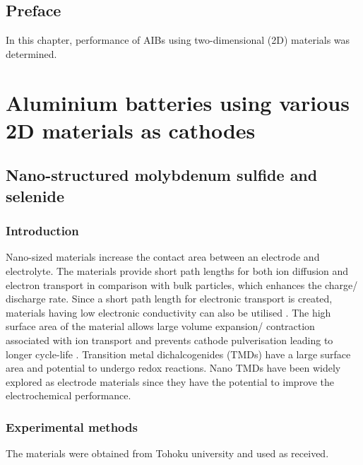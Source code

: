 \section*{Preface}
In this chapter, performance of AIBs using two-dimensional (2D) materials was determined.
\pagebreak
\chapter{Aluminium batteries using various 2D materials as cathodes} 
\label{chap6} 

\section{Nano-structured molybdenum sulfide and selenide}

\subsection{Introduction}
Nano-sized materials increase the contact area between an electrode and electrolyte. The materials provide short path lengths for both ion diffusion and electron transport in comparison with bulk particles, which enhances the charge/ discharge rate. Since a short path length for electronic transport is created, materials having low electronic conductivity can also be utilised \cite{pitchai_nanostructured_2011}. The high surface area of the material allows large volume expansion/ contraction associated with ion transport and prevents cathode pulverisation leading to longer cycle-life \cite{zhang_ultrathin_2015, cong_intrinsic_2015}. 
Transition metal dichalcogenides (TMDs) have a large surface area and potential to undergo redox reactions. Nano TMDs have been widely explored as electrode materials since they have the potential to improve the electrochemical performance.  

\subsection{Experimental methods}
The materials were obtained from Tohoku university and used as received. 


